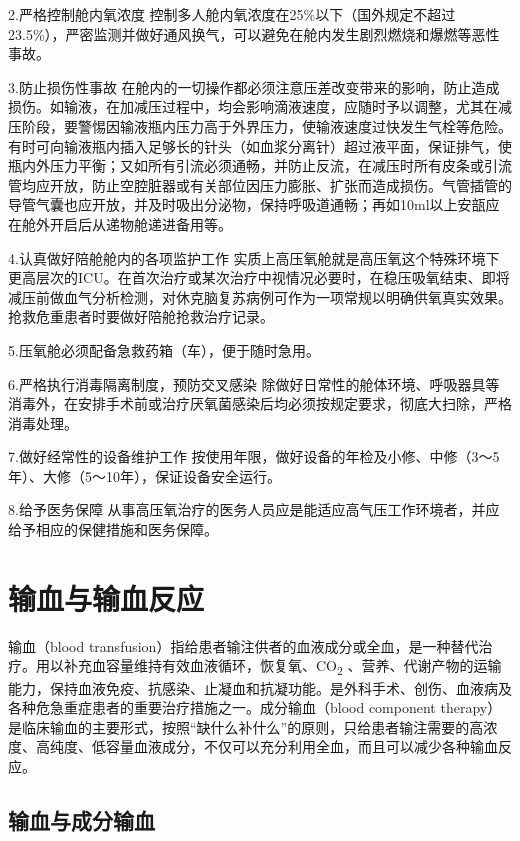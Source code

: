 2.严格控制舱内氧浓度
控制多人舱内氧浓度在25\%以下（国外规定不超过23.5\%），严密监测并做好通风换气，可以避免在舱内发生剧烈燃烧和爆燃等恶性事故。

3.防止损伤性事故
在舱内的一切操作都必须注意压差改变带来的影响，防止造成损伤。如输液，在加减压过程中，均会影响滴液速度，应随时予以调整，尤其在减压阶段，要警惕因输液瓶内压力高于外界压力，使输液速度过快发生气栓等危险。有时可向输液瓶内插入足够长的针头（如血浆分离针）超过液平面，保证排气，使瓶内外压力平衡；又如所有引流必须通畅，并防止反流，在减压时所有皮条或引流管均应开放，防止空腔脏器或有关部位因压力膨胀、扩张而造成损伤。气管插管的导管气囊也应开放，并及时吸出分泌物，保持呼吸道通畅；再如10ml以上安瓿应在舱外开启后从递物舱递进备用等。

4.认真做好陪舱舱内的各项监护工作
实质上高压氧舱就是高压氧这个特殊环境下更高层次的ICU。在首次治疗或某次治疗中视情况必要时，在稳压吸氧结束、即将减压前做血气分析检测，对休克脑复苏病例可作为一项常规以明确供氧真实效果。抢救危重患者时要做好陪舱抢救治疗记录。

5.压氧舱必须配备急救药箱（车），便于随时急用。

6.严格执行消毒隔离制度，预防交叉感染
除做好日常性的舱体环境、呼吸器具等消毒外，在安排手术前或治疗厌氧菌感染后均必须按规定要求，彻底大扫除，严格消毒处理。

7.做好经常性的设备维护工作
按使用年限，做好设备的年检及小修、中修（3～5年）、大修（5～10年），保证设备安全运行。

8.给予医务保障
从事高压氧治疗的医务人员应是能适应高气压工作环境者，并应给予相应的保健措施和医务保障。

\protect\hypertarget{text00396.html}{}{}

\chapter{输血与输血反应}

输血（blood
transfusion）指给患者输注供者的血液成分或全血，是一种替代治疗。用以补充血容量维持有效血液循环，恢复氧、CO\textsubscript{2}
、营养、代谢产物的运输能力，保持血液免疫、抗感染、止凝血和抗凝功能。是外科手术、创伤、血液病及各种危急重症患者的重要治疗措施之一。成分输血（blood
component
therapy）是临床输血的主要形式，按照“缺什么补什么”的原则，只给患者输注需要的高浓度、高纯度、低容量血液成分，不仅可以充分利用全血，而且可以减少各种输血反应。

\section{输血与成分输血}

